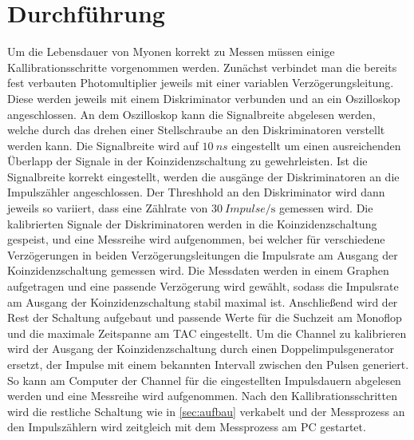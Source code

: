 \section{Durchführung}
\label{sec:Durchführung}
Um die Lebensdauer von Myonen korrekt zu Messen müssen einige Kallibrationsschritte vorgenommen werden. Zunächst verbindet man die bereits fest verbauten Photomultiplier jeweils mit einer variablen Verzögerungsleitung.
Diese werden jeweils mit einem Diskriminator verbunden und an ein Oszilloskop angeschlossen. An dem Oszilloskop kann die Signalbreite abgelesen werden, welche durch das drehen einer Stellschraube an den Diskriminatoren verstellt werden kann. 
Die Signalbreite wird auf $\SI{10}{ns}$ eingestellt um einen ausreichenden Überlapp der Signale in der Koinzidenzschaltung zu gewehrleisten. Ist die Signalbreite korrekt eingestellt, werden die ausgänge der Diskriminatoren an die Impulszähler angeschlossen. Der Threshhold an den Diskriminator wird dann jeweils so variiert, dass eine Zählrate von $\SI{30}{Impulse\per\second}$ gemessen wird. 
Die kalibrierten Signale der Diskriminatoren werden in die Koinzidenzschaltung gespeist, und eine Messreihe wird aufgenommen, bei welcher für verschiedene Verzögerungen in beiden Verzögerungsleitungen die Impulsrate am Ausgang der Koinzidenzschaltung gemessen wird. Die Messdaten werden in einem Graphen aufgetragen und eine passende Verzögerung wird gewählt, sodass die Impulsrate am Ausgang der Koinzidenzschaltung stabil maximal ist. 
Anschließend wird der Rest der Schaltung aufgebaut und passende Werte für die Suchzeit am Monoflop und die maximale Zeitspanne am TAC eingestellt. Um die Channel zu kalibrieren wird der Ausgang der Koinzidenzschaltung durch einen Doppelimpulsgenerator ersetzt, der Impulse mit
einem bekannten Intervall zwischen den Pulsen generiert. So kann am Computer der Channel für die eingestellten Impulsdauern abgelesen werden und eine Messreihe wird aufgenommen. Nach den Kallibrationsschritten wird die restliche Schaltung wie in \autoref{sec:aufbau} verkabelt und der Messprozess an den Impulszählern wird zeitgleich mit dem Messprozess am PC gestartet.

\newpage
